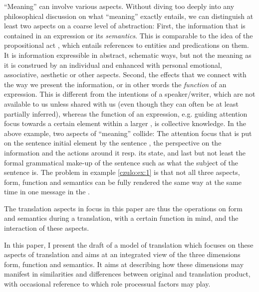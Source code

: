 \documentclass[output=paper]{LSP/langsci}
\begin{document}
``Meaning'' can involve various aspects. Without diving too deeply into any philosophical discussion on what ``meaning'' exactly entails, we can distinguish at least two aspects on a coarse level of abstraction: First, the information that is contained in an expression or its \textit{semantics}. This is comparable to the idea of the propositional act \citep{Searle1969}, which entails references to entities and predications on them. It is information expressible in abstract, schematic ways, but not the meaning as it is construed by an individual and enhanced with personal emotional, associative, aesthetic or other aspects. Second, the effects that we connect with the way we present the information, or in other words the \textit{function} of an expression. This is different from the intentions of a speaker/writer, which are not available to us unless shared with us (even though they can often be at least partially inferred), whereas the function of an expression, e.g. guiding attention focus towards a certain element within a larger , is collective knowledge. In the above example, two aspects of ``meaning'' collide: The attention focus that is put on the sentence initial element by the  sentence , the perspective on the information and the actions around it resp. its state, and last but not least the formal grammatical make-up of the sentence such as what the subject of the sentence is. The problem in example \ref{czulo:ex:1} is that not all three aspects, form, function and semantics can be fully rendered the same way at the same time in one message in the .

The translation aspects in focus in this paper are thus the operations on form and semantics during a translation, with a certain function in mind, and the interaction of these aspects.

\newpage 
In this paper, I present the draft of a model of translation which focuses on these aspects of translation and aims at an integrated view of the three dimensions form, function and semantics. It aims at describing how these dimensions may manifest in similarities and differences between original and translation product, with occasional reference to which role processual factors may play.
\end{document}
